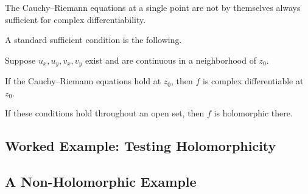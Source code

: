 The Cauchy--Riemann equations at a single point are not by themselves
always sufficient for complex differentiability.

A standard sufficient condition is the following.

\begin{theorem}
Suppose \(u_x,u_y,v_x,v_y\) exist and are continuous in a neighborhood of
\(z_0\).

If the Cauchy--Riemann equations hold at \(z_0\), then \(f\) is complex
differentiable at \(z_0\).
\end{theorem}

If these conditions hold throughout an open set, then \(f\) is
holomorphic there.

\subsection{Worked Example: Testing Holomorphicity}
\label{subsec:worked-holomorphicity}


\subsection{A Non-Holomorphic Example}
\label{subsec:nonholomorphic-conjugate}

